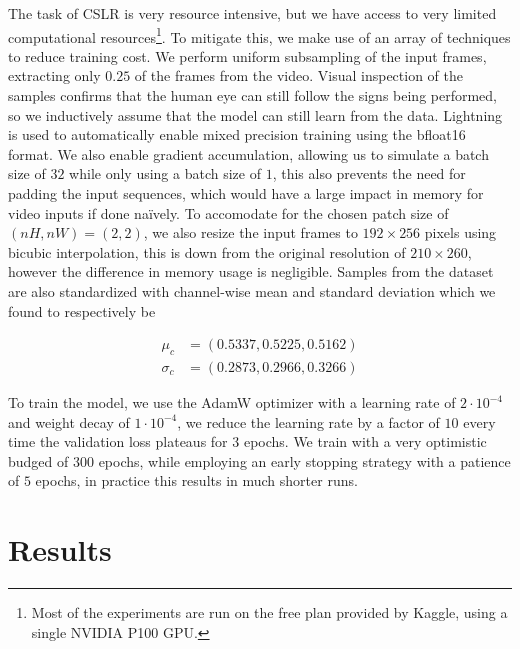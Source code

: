 \documentclass{IEEEtran}
\begin{document}
The task of CSLR is very resource intensive, but we have access to very limited computational resources\footnote{Most of the experiments are run on the free plan provided by Kaggle, using a single NVIDIA P100 GPU.}. To mitigate this, we make use of an array of techniques to reduce training cost.
We perform uniform subsampling of the input frames, extracting only $0.25$ of the frames from the video. Visual inspection of the samples confirms that the human eye can still follow the signs being performed, so we inductively assume that the model can still learn from the data.
Lightning is used to automatically enable mixed precision training using the bfloat16\cite{burgess_bfloat16_2019} format. We also enable gradient accumulation, allowing us to simulate
a batch size of $32$ while only using a batch size of $1$, this also prevents the need 
for padding the input sequences, which would have a large impact in memory for video inputs if done naïvely. To accomodate for the chosen patch size of $(nH, nW) = (2, 2)$, we also resize the input frames to $192 \times 256$ pixels using bicubic interpolation, this is down from the original resolution of $210 \times 260$, however the difference in memory usage is negligible. Samples from the dataset are also standardized with channel-wise mean and standard deviation which we found to respectively be

\begin{align*}
    \mu_c &= (0.5337, 0.5225, 0.5162)\\
    \sigma_c &= (0.2873, 0.2966, 0.3266)
\end{align*}

To train the model, we use the AdamW\cite{loshchilov_decoupled_2019} optimizer with a learning rate of $2\cdot10^{-4}$ and weight decay of $1\cdot10^{-4}$, we reduce the learning rate by a factor of $10$ every time the validation loss plateaus for $3$ epochs. We train with a very optimistic budged of $300$ epochs, while employing an early stopping strategy with a patience of $5$ epochs, in practice this results in much shorter runs.

\section{Results}
\end{document}
